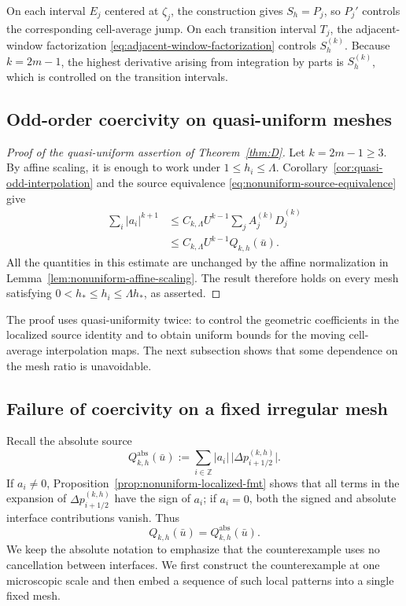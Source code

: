 \documentclass[11pt]{amsart}
\theoremstyle{plain}
\theoremstyle{definition}
\theoremstyle{remark}
\numberwithin{equation}{section}
\theoremstyle{plain}
\begin{document}
On each interval $E_j$ centered at $\zeta_j$, the construction gives
$S_h=P_j$, so $P_j'$ controls the corresponding cell-average jump.  On each transition interval $T_j$, the
adjacent-window factorization \eqref{eq:adjacent-window-factorization}
controls $S_h^{(k)}$.
Because $k=2m-1$, the highest derivative arising from integration by
parts is $S_h^{(k)}$, which is controlled on the transition intervals.

\subsection{Odd-order coercivity on quasi-uniform meshes}
\label{sec:quasi-uniform-coercivity}

\begin{proof}[Proof of the quasi-uniform assertion of
	Theorem~\ref{thm:D}]
	Let $k=2m-1\ge3$.  By affine scaling, it is enough to work under
	$1\le h_i\le\Lambda$.  Corollary~\ref{cor:quasi-odd-interpolation} and the
	source equivalence \eqref{eq:nonuniform-source-equivalence} give
	\begin{align*}
		\sum_i|a_i|^{k+1}
		&\le C_{k,\Lambda}U^{k-1}
		\sum_j A_j^{(k)}\widehat D_j^{(k)}\\
		&\le C_{k,\Lambda}U^{k-1}Q_{k,h}(\bar u).
	\end{align*}
	All the quantities in this estimate are unchanged by the affine
	normalization in Lemma~\ref{lem:nonuniform-affine-scaling}.  The result
	therefore holds on every mesh satisfying
	$0<h_*\le h_i\le\Lambda h_*$, as asserted.
\end{proof}

The proof uses quasi-uniformity twice: to control the geometric
coefficients in the localized source identity and to obtain uniform bounds
for the moving cell-average interpolation maps.  The next subsection shows
that some dependence on the mesh ratio is unavoidable.

\subsection{\texorpdfstring{Failure of coercivity on a fixed irregular
mesh}{Failure of coercivity on a fixed irregular mesh}}
\label{sec:arbitrary-mesh-counterexample}

Recall the absolute source
\begin{equation}\label{eq:absolute-nonuniform-source}
	Q_{k,h}^{\mathrm{abs}}(\bar u)
	:=
	\sum_{i\in\mathbb Z}|a_i|\,
	\bigl|\Delta p_{i+1/2}^{(k,h)}\bigr|.
\end{equation}
If $a_i\ne0$, Proposition~\ref{prop:nonuniform-localized-fmt} shows that all
terms in the expansion of $\Delta p_{i+1/2}^{(k,h)}$ have the sign of
$a_i$; if $a_i=0$, both the signed and absolute interface contributions
vanish.
Thus
\begin{equation}\label{eq:signed-equals-absolute-source}
	Q_{k,h}(\bar u)=Q_{k,h}^{\mathrm{abs}}(\bar u).
\end{equation}
We keep the absolute notation to emphasize that the counterexample uses
no cancellation between interfaces.
We first construct the counterexample at one microscopic scale and then
embed a sequence of such local patterns into a single fixed mesh.
\end{document}
